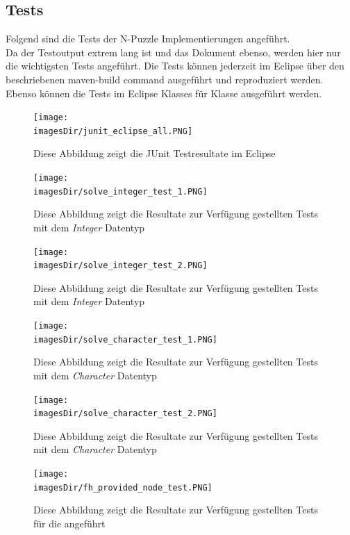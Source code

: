 \documentclass[11pt, a4paper, twoside]{article}   	%
\newcommand{\imagesDir}{images}
\newcommand{\testSection}{Tests}
\begin{document}
\subsection{\testSection}
Folgend sind die Tests der N-Puzzle Implementierungen angeführt.\\
Da der Testoutput extrem lang ist und das Dokument ebenso, werden hier nur die wichtigsten Tests angeführt. Die Tests können jederzeit im Eclipse über den beschriebenen maven-build command ausgeführt und reproduziert werden. Ebenso können die Tests im Eclipse Klasses für Klasse ausgeführt werden.

\begin{figure}[h]
	\centering
	\texttt{[image: \\imagesDir/junit\_eclipse\_all.PNG]}
	\caption
	{Diese Abbildung zeigt die JUnit Testresultate im Eclipse}
\end{figure}
\newpage

\begin{figure}[h]
	\centering
	\texttt{[image: \\imagesDir/solve\_integer\_test\_1.PNG]}
	\caption
	{Diese Abbildung zeigt die Resultate zur Verfügung gestellten Tests mit dem \emph{Integer} Datentyp}
\end{figure}
\newpage

\begin{figure}[h]
	\centering
	\texttt{[image: \\imagesDir/solve\_integer\_test\_2.PNG]}
	\caption
	{Diese Abbildung zeigt die Resultate zur Verfügung gestellten Tests mit dem \emph{Integer} Datentyp}
\end{figure}
\newpage

\begin{figure}[h]
	\centering
	\texttt{[image: \\imagesDir/solve\_character\_test\_1.PNG]}
	\caption
	{Diese Abbildung zeigt die Resultate zur Verfügung gestellten Tests mit dem \emph{Character} Datentyp}
\end{figure}
\newpage

\begin{figure}[h]
	\centering
	\texttt{[image: \\imagesDir/solve\_character\_test\_2.PNG]}
	\caption
	{Diese Abbildung zeigt die Resultate zur Verfügung gestellten Tests mit dem \emph{Character} Datentyp}
\end{figure}
\newpage

\begin{figure}[h]
	\centering
	\texttt{[image: \\imagesDir/fh\_provided\_node\_test.PNG]}
	\caption
	{Diese Abbildung zeigt die Resultate zur Verfügung gestellten Tests für die  angeführt}
\end{figure}
\newpage
\end{document}
